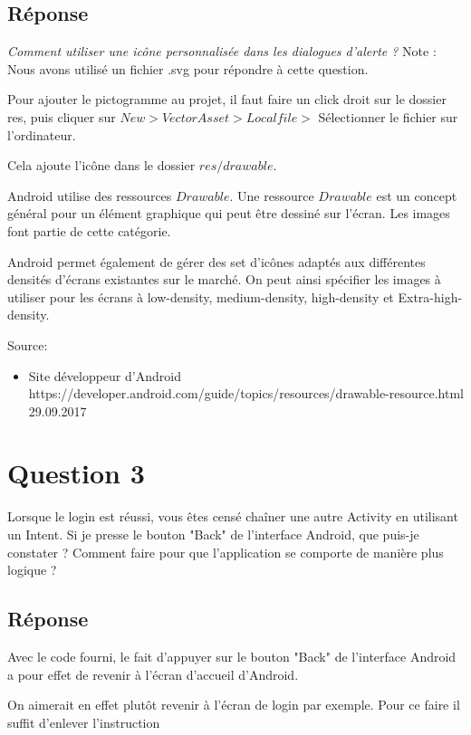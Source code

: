 \documentclass[francais,12pt]{article}
\begin{document}
		\subsection*{Réponse}
		
		\textit{Comment utiliser une icône personnalisée dans les dialogues d'alerte ?}
		Note : Nous avons utilisé un fichier .svg pour répondre à cette question. \newline
		
		Pour ajouter le pictogramme au projet, il faut faire un click droit sur le dossier res, puis cliquer sur $New > Vector Asset > Local file >$ Sélectionner le fichier sur l'ordinateur. 
		
		Cela ajoute l'icône dans le dossier $res/drawable. $
		
		Android utilise des ressources $Drawable$. Une ressource $Drawable$ est un concept général pour un élément graphique qui peut être dessiné sur l'écran. Les images font partie de cette catégorie. 
		
		Android permet également de gérer des set d'icônes adaptés aux différentes densités d'écrans existantes sur le marché. On peut ainsi spécifier les images à utiliser pour les écrans à low-density, medium-density, high-density et Extra-high-density. 
		
		Source:
		\begin{itemize}
			\item 	Site développeur d'Android\newline
			https://developer.android.com/guide/topics/resources/drawable-resource.html 
			29.09.2017
		\end{itemize}
		
	\section*{Question 3}
		Lorsque le login est réussi, vous êtes censé chaîner une autre Activity en utilisant un Intent. Si je presse le bouton "Back" de l'interface Android, que puis-je constater ? Comment faire pour que l'application se comporte de manière plus logique ?
		
		\subsection*{Réponse}
		Avec le code fourni, le fait d'appuyer sur le bouton "Back" de l'interface Android a pour effet de revenir à l'écran d'accueil d'Android. 
		
		On aimerait en effet plutôt revenir à l'écran de login par exemple. Pour ce faire il suffit d'enlever l'instruction 
		
\end{document}
